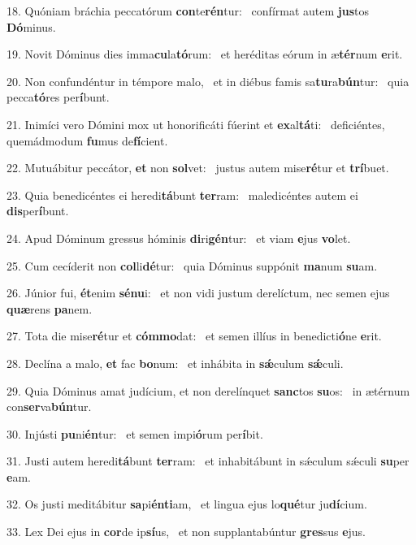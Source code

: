 18. Quóniam bráchia peccatórum \textbf{con}te\textbf{rén}tur: \ast\  confírmat autem \textbf{jus}tos \textbf{Dó}minus.\

19. Novit Dóminus dies imma\textbf{cu}la\textbf{tó}rum: \ast\  et heréditas eórum in æ\textbf{tér}num \textbf{e}rit.\

20. Non confundéntur in témpore malo, \dag\  et in diébus famis sa\textbf{tu}ra\textbf{bún}tur: \ast\  quia pecca\textbf{tó}res per\textbf{í}bunt.\

21. Inimíci vero Dómini mox ut honorificáti fúerint et \textbf{ex}al\textbf{tá}ti: \ast\  deficiéntes, quemádmodum \textbf{fu}mus de\textbf{fí}cient.\

22. Mutuábitur peccátor, \textbf{et} non \textbf{sol}vet: \ast\  justus autem mise\textbf{ré}tur et \textbf{trí}buet.\

23. Quia benedicéntes ei heredi\textbf{tá}bunt \textbf{ter}ram: \ast\  maledicéntes autem ei \textbf{dis}per\textbf{í}bunt.\

24. Apud Dóminum gressus hóminis \textbf{di}ri\textbf{gén}tur: \ast\  et viam \textbf{e}jus \textbf{vo}let.\

25. Cum cecíderit non \textbf{col}li\textbf{dé}tur: \ast\  quia Dóminus suppónit \textbf{ma}num \textbf{su}am.\

26. Júnior fui, \textbf{ét}enim \textbf{sé}\textbf{nu}i: \ast\  et non vidi justum derelíctum, nec semen ejus \textbf{quæ}rens \textbf{pa}nem.\

27. Tota die mise\textbf{ré}tur et \textbf{cóm}\textbf{mo}dat: \ast\  et semen illíus in benedicti\textbf{ó}ne \textbf{e}rit.\

28. Declína a malo, \textbf{et} fac \textbf{bo}num: \ast\  et inhábita in \textbf{sǽ}culum \textbf{sǽ}culi.\

29. Quia Dóminus amat judícium, et non derelínquet \textbf{sanc}tos \textbf{su}os: \ast\  in ætérnum con\textbf{ser}va\textbf{bún}tur.\

30. Injústi \textbf{pu}ni\textbf{én}tur: \ast\  et semen impi\textbf{ó}rum per\textbf{í}bit.\

31. Justi autem heredi\textbf{tá}bunt \textbf{ter}ram: \ast\  et inhabitábunt in sǽculum sǽculi \textbf{su}per \textbf{e}am.\

32. Os justi meditábitur \textbf{sa}pi\textbf{én}\textbf{ti}am, \ast\  et lingua ejus lo\textbf{qué}tur ju\textbf{dí}cium.\

33. Lex Dei ejus in \textbf{cor}de ip\textbf{sí}us, \ast\  et non supplantabúntur \textbf{gres}sus \textbf{e}jus.\

